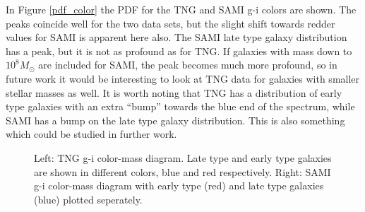 In Figure \ref{pdf_color} the PDF for the TNG and SAMI g-i colors are shown. The peaks coincide well for the two data sets, but the slight shift towards redder values for SAMI is apparent here also. The SAMI late type galaxy distribution has a peak, but it is not as profound as for TNG. If galaxies with mass down to $10^8 M_{\odot}$ are included for SAMI, the peak becomes much more profound, so in future work it would be interesting to look at TNG data for galaxies with smaller stellar masses as well. It is worth noting that TNG has a distribution of early type galaxies with an extra ``bump'' towards the blue end of the spectrum, while SAMI has a bump on the late type galaxy distribution. This is also something which could be studied in further work. 
\begin{figure}
    \centering
    \caption{Left: TNG g-i color-mass diagram. Late type and early type galaxies are shown in different colors, blue and red respectively. Right: SAMI g-i color-mass diagram with early type (red) and late type galaxies (blue) plotted seperately.}
    \label{color_magnitude_res}
\end{figure}


